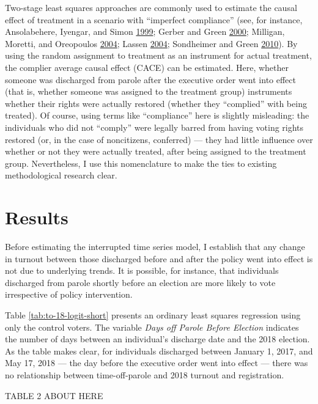 \documentclass[
  12pt,
]{article}
\begin{document}
Two-stage least squares approaches are commonly used to estimate the causal effect of treatment in a scenario with ``imperfect compliance'' (see, for instance, Ansolabehere, Iyengar, and Simon \protect\hyperlink{ref-Ansolabehere1999}{1999}; Gerber and Green \protect\hyperlink{ref-Gerber2000}{2000}; Milligan, Moretti, and Oreopoulos \protect\hyperlink{ref-Milligan2004}{2004}; Lassen \protect\hyperlink{ref-Lassen2004}{2004}; Sondheimer and Green \protect\hyperlink{ref-Sondheimer2010}{2010}). By using the random assignment to treatment as an instrument for actual treatment, the complier average causal effect (CACE) can be estimated. Here, whether someone was discharged from parole after the executive order went into effect (that is, whether someone was assigned to the treatment group) instruments whether their rights were actually restored (whether they ``complied'' with being treated). Of course, using terms like ``compliance'' here is slightly misleading: the individuals who did not ``comply'' were legally barred from having voting rights restored (or, in the case of noncitizens, conferred) --- they had little influence over whether or not they were actually treated, after being assigned to the treatment group. Nevertheless, I use this nomenclature to make the ties to existing methodological research clear.

\hypertarget{results}{%
\section*{Results}\label{results}}

Before estimating the interrupted time series model, I establish that any change in turnout between those discharged before and after the policy went into effect is not due to underlying trends. It is possible, for instance, that individuals discharged from parole shortly before an election are more likely to vote irrespective of policy intervention.

Table \ref{tab:to-18-logit-short} presents an ordinary least squares regression using only the control voters. The variable \emph{Days off Parole Before Election} indicates the number of days between an individual's discharge date and the 2018 election. As the table makes clear, for individuals discharged between January 1, 2017, and May 17, 2018 --- the day before the executive order went into effect --- there was no relationship between time-off-parole and 2018 turnout and registration.

TABLE 2 ABOUT HERE
\end{document}

